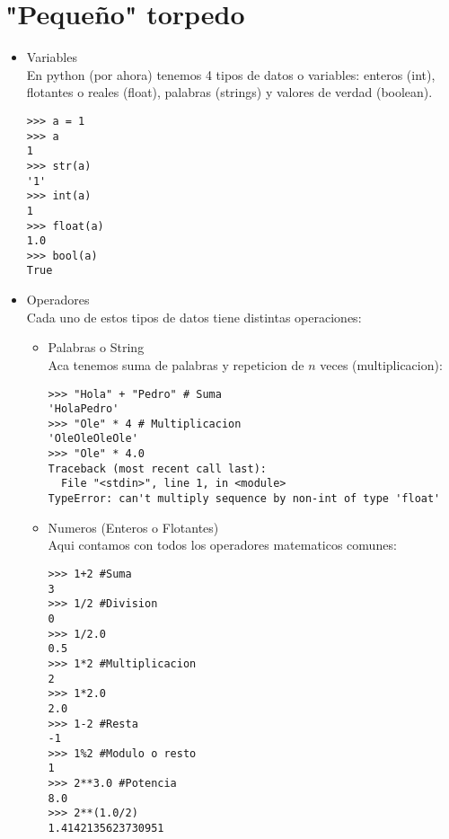\section{"Pequeño" torpedo}


\begin{itemize}
    \item Variables \\
En python (por ahora) tenemos 4 tipos de datos o variables: enteros (int), flotantes o reales (float), palabras (strings) y valores de verdad (boolean).
\begin{lstlisting}[style=consola]
>>> a = 1
>>> a
1
>>> str(a)
'1'
>>> int(a)
1
>>> float(a)
1.0
>>> bool(a)
True
\end{lstlisting}

    \item Operadores \\
Cada uno de estos tipos de datos tiene distintas operaciones:
    \begin{itemize}
        \item Palabras o String\\
            Aca tenemos suma de palabras y repeticion de $n$ veces (multiplicacion):
            \begin{lstlisting}[style=consola]
>>> "Hola" + "Pedro" # Suma
'HolaPedro'
>>> "Ole" * 4 # Multiplicacion
'OleOleOleOle'
>>> "Ole" * 4.0
Traceback (most recent call last):
  File "<stdin>", line 1, in <module>
TypeError: can't multiply sequence by non-int of type 'float'
            \end{lstlisting}
        \item Numeros (Enteros o Flotantes)\\
            Aqui contamos con todos los operadores matematicos comunes:
            \begin{lstlisting}[style=consola]
>>> 1+2 #Suma
3
>>> 1/2 #Division
0
>>> 1/2.0
0.5
>>> 1*2 #Multiplicacion
2
>>> 1*2.0
2.0
>>> 1-2 #Resta
-1
>>> 1%2 #Modulo o resto
1
>>> 2**3.0 #Potencia
8.0
>>> 2**(1.0/2)
1.4142135623730951
            \end{lstlisting}



\end{itemize}
\end{itemize}
